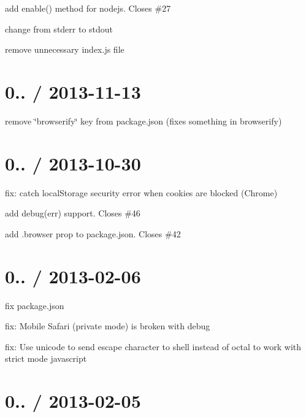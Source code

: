 \begin{DoxyItemize}
\item add {\ttfamily enable()} method for nodejs. Closes \#27
\item change from stderr to stdout
\item remove unnecessary index.\+js file
\end{DoxyItemize}

\section*{0.. / 2013-\/11-\/13 }


\begin{DoxyItemize}
\item remove \char`\"{}browserify\char`\"{} key from package.\+json (fixes something in browserify)
\end{DoxyItemize}

\section*{0.. / 2013-\/10-\/30 }


\begin{DoxyItemize}
\item fix\+: catch local\+Storage security error when cookies are blocked (Chrome)
\item add debug(err) support. Closes \#46
\item add .browser prop to package.\+json. Closes \#42
\end{DoxyItemize}

\section*{0.. / 2013-\/02-\/06 }


\begin{DoxyItemize}
\item fix package.\+json
\item fix\+: Mobile Safari (private mode) is broken with debug
\item fix\+: Use unicode to send escape character to shell instead of octal to work with strict mode javascript
\end{DoxyItemize}

\section*{0.. / 2013-\/02-\/05 }


